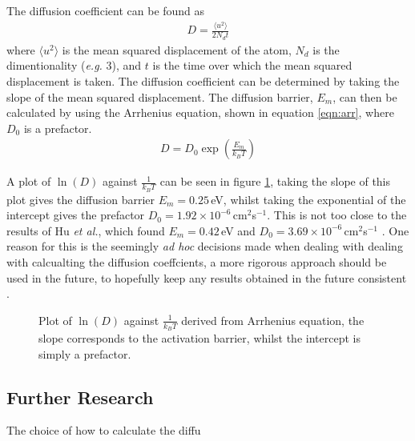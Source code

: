 \documentclass[10pt,a4paper,twocolumn,twoside]{extarticle}
\newcommand{\al}{\emph{et al.}}
\begin{document}
The diffusion coefficient can be found as 
\begin{align}
	D = \frac{\langle u^2 \rangle}{2N_dt}
\end{align}
where $\langle u^2 \rangle$ is the mean squared displacement of the atom, $N_d$ is the dimentionality (\emph{e.g.} 3), and $t$ is the time over which the mean squared displacement is taken. The diffusion coefficient can be determined by taking the slope of the mean squared displacement. The diffusion barrier, $E_m$, can then be calculated by using the Arrhenius equation, shown in equation \ref{eqn:arr}, where $D_0$ is a prefactor. 
\begin{align}
	\label{eqn:arr}
	D = D_0 \exp(\frac{E_m}{k_BT})
\end{align}

A plot of $\ln(D)$ against $\frac{1}{k_BT}$ can be seen in figure \ref{fig:arr}, taking the slope of this plot gives the diffusion barrier $E_m = 0.25$\,eV, whilst taking the exponential of the intercept gives the prefactor $D_0 = 1.92\times10^{-6}$\,cm$^2$s$^{-1}$. This is not too close to the results of Hu \al, which found $E_m = 0.42$\,eV and $D_0 = 3.69\times10^{-6}$\,cm$^2$s$^{-1}$ \cite{hu}. One reason for this is the seemingly \emph{ad hoc} decisions made when dealing with dealing with calcualting the diffusion coeffcients, a more rigorous approach should be used in the future, to hopefully keep any results obtained in the future consistent \cite{DiffusionRigorous}.


\begin{figure}
		\resizebox{\columnwidth}{!}{%
		
		}
		\caption{Plot of $\ln(D)$ against $\frac{1}{k_BT}$ derived from  Arrhenius equation, the slope corresponds  to the activation barrier, whilst the intercept is simply a prefactor.}
		\label{fig:arr}
\end{figure}


\subsection{Further Research}
The choice of how to calculate the diffu
\end{document}
